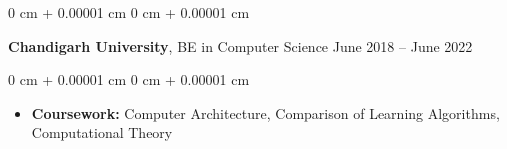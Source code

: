 \documentclass[10pt, letterpaper]{article}
\newenvironment{highlights}{
    \begin{itemize}[
        topsep=0.10 cm,
        parsep=0.10 cm,
        partopsep=0pt,
        itemsep=0pt,
        leftmargin=0 cm + 10pt
    ]
}{
    \end{itemize}
} %
\newenvironment{onecolentry}{
    \begin{adjustwidth}{
        0 cm + 0.00001 cm
    }{
        0 cm + 0.00001 cm
    }
}{
    \end{adjustwidth}
} %
\newenvironment{twocolentry}[2][]{
    \onecolentry
    \def\secondColumn{#2}
    \setcolumnwidth{\fill, 4.5 cm}
    \begin{paracol}{2}
}{
    \switchcolumn \raggedleft \secondColumn
    \end{paracol}
    \endonecolentry
} %
\begin{document}
        
        \begin{twocolentry}{
            June 2018 – June 2022
        }
            \textbf{Chandigarh University}, BE in Computer Science\end{twocolentry}

        \vspace{0.10 cm}
        \begin{onecolentry}
            \begin{highlights}
                \item \textbf{Coursework:} Computer Architecture, Comparison of Learning Algorithms, Computational Theory
            \end{highlights}
        \end{onecolentry}



    
\end{document}
